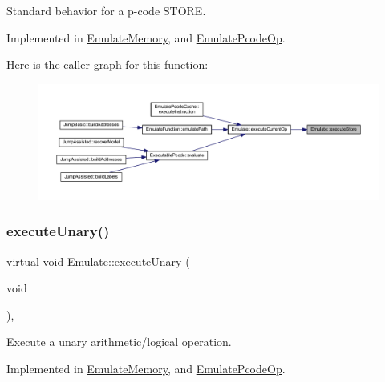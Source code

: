 Standard behavior for a p-\/code S\+T\+O\+RE. 



Implemented in \mbox{\hyperlink{class_emulate_memory_a3fed95d66c73d4dad23532f959a9417d}{Emulate\+Memory}}, and \mbox{\hyperlink{class_emulate_pcode_op_a3e050bb94bc5f0cca844cc60aa0e4702}{Emulate\+Pcode\+Op}}.

Here is the caller graph for this function\+:
\nopagebreak
\begin{figure}[H]
\begin{center}
\leavevmode
\includegraphics[width=350pt]{class_emulate_a634f0261bf49be73e7d31a2baf9f6e4d_icgraph}
\end{center}
\end{figure}
\mbox{\label{class_emulate_a95111238fb3061b23db2e94ec280b34f}} 
\subsubsection{\texorpdfstring{executeUnary()}{executeUnary()}}
{\footnotesize\ttfamily virtual void Emulate\+::execute\+Unary (\begin{DoxyParamCaption}\item[{void}]{ }\end{DoxyParamCaption})\hspace{0.3cm}{\ttfamily [protected]}, {}}



Execute a unary arithmetic/logical operation. 



Implemented in \mbox{\hyperlink{class_emulate_memory_af31f9f35bb843b59d6a509bcbb045894}{Emulate\+Memory}}, and \mbox{\hyperlink{class_emulate_pcode_op_acdcfb1ee505eb8eeac882ddef564f18e}{Emulate\+Pcode\+Op}}.

